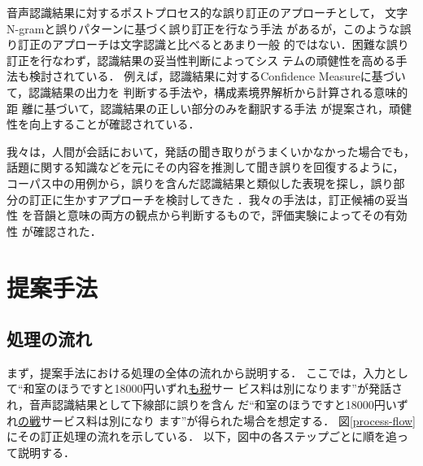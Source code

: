 音声認識結果に対するポストプロセス的な誤り訂正のアプローチとして，
文字N-gramと誤りパターンに基づく誤り訂正を行なう手法\cite{Kaki1998}
があるが，このような誤り訂正のアプローチは文字認識と比べるとあまり一般
的ではない．困難な誤り訂正を行なわず，認識結果の妥当性判断によってシス
テムの頑健性を高める手法も検討されている．
例えば，認識結果に対するConfidence Measureに基づいて，認識結果の出力を
判断する手法\cite{Moreau1999}や，構成素境界解析から計算される意味的距
離に基づいて，認識結果の正しい部分のみを翻訳する手法\cite{Wakita1998}
が提案され，頑健性を向上することが確認されている．

我々は，人間が会話において，発話の聞き取りがうまくいかなかった場合でも，
話題に関する知識などを元にその内容を推測して聞き誤りを回復するように，
コーパス中の用例から，誤りを含んだ認識結果と類似した表現を探し，誤り部
分の訂正に生かすアプローチを検討してきた
\cite{Ishikawa1998}\cite{Ishikawa1999}．我々の手法は，訂正候補の妥当性
を音韻と意味の両方の観点から判断するもので，評価実験によってその有効性
が確認された．



\section{提案手法}

\subsection{処理の流れ}

まず，提案手法における処理の全体の流れから説明する．
ここでは，入力として``和室のほうですと18000円いずれ\underline{も税}サー
ビス料は別になります''が発話され，音声認識結果として下線部に誤りを含ん
だ``和室のほうですと18000円いずれ\underline{の戦}サービス料は別になり
ます''が得られた場合を想定する．
図\ref{process-flow}にその訂正処理の流れを示している．
以下，図中の各ステップごとに順を追って説明する．

